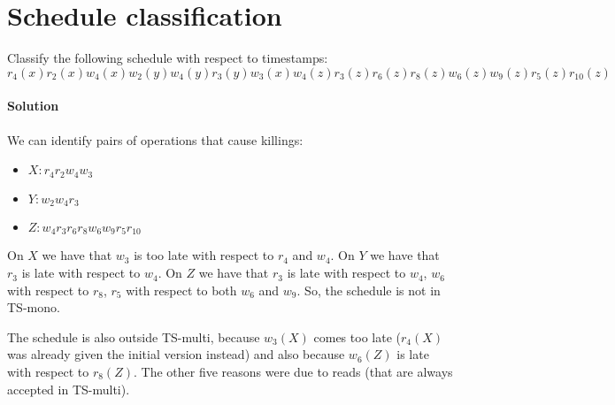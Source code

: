 \section{Schedule classification}

Classify the following schedule with respect to timestamps: 
\[r_4(x) r_2(x) w_4(x) w_2(y) w_4(y) r_3(y) w_3(x) w_4(z) r_3(z) r_6(z) r_8(z) w_6(z) w_9(z) r_5(z) r_{10}(z)\]

\paragraph*{Solution}
We can identify pairs of operations that cause killings:
\begin{itemize}
    \item $X: r_4 r_2 w_4 w_3$
    \item $Y: w_2 w_4 r_3$
    \item $Z: w_4 r_3 r_6 r_8 w_6 w_9 r_5 r_{10}$
\end{itemize}
On $X$ we have that $w_3$ is too late with respect to $r_4$ and $w_4$. On $Y$ we have that $r_3$ is late with respect to $w_4$. 
On $Z$ we have that $r_3$ is late with respect to $w_4$, $w_6$ with respect to $r_8$, $r_5$ with respect to both $w_6$ and $w_9$. 
So, the schedule is not in TS-mono. 

The schedule is also outside TS-multi, because $w_3(X)$ comes too late ($r_4(X)$ was already given the initial version instead) and also because $w_6(Z)$ is late with respect to $r_8(Z)$. 
The other five reasons were due to reads (that are always accepted in TS-multi).